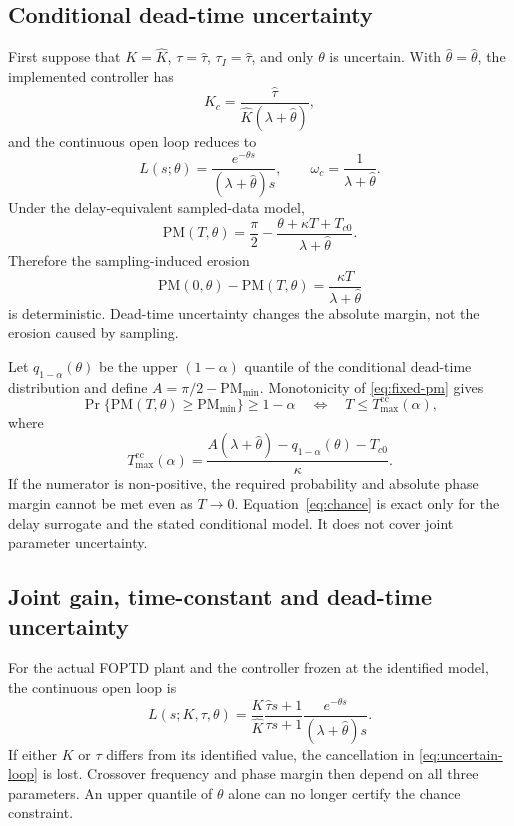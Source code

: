 \documentclass[a4paper,fleqn]{cas-sc}
\theoremstyle{remark}
\newcommand{\Tmaxcc}{T_{\max}^{\mathrm{cc}}}
\newcommand{\thetad}{\widehat{\theta}}
\begin{document}
\subsection{Conditional dead-time uncertainty}
First suppose that $K=\widehat K$, $\tau=\widehat\tau$, $\tau_I=\widehat\tau$, and only $\theta$ is uncertain. With $\thetad=\widehat\theta$, the implemented controller has
\begin{equation}
K_c=\frac{\widehat\tau}{\widehat K(\lambda+\thetad)},
\label{eq:fixed-controller}
\end{equation}
and the continuous open loop reduces to
\begin{equation}
L(s;\theta)=\frac{e^{-\theta s}}{(\lambda+\thetad)s},
\qquad \omega_c=\frac{1}{\lambda+\thetad}.
\label{eq:uncertain-loop}
\end{equation}
Under the delay-equivalent sampled-data model,
\begin{equation}
\mathrm{PM}(T,\theta)=\frac{\pi}{2}
-\frac{\theta+\kappa T+T_{c0}}{\lambda+\thetad}.
\label{eq:fixed-pm}
\end{equation}
Therefore the sampling-induced erosion
\begin{equation}
\mathrm{PM}(0,\theta)-\mathrm{PM}(T,\theta)
=\frac{\kappa T}{\lambda+\thetad}
\label{eq:fixed-erosion}
\end{equation}
is deterministic. Dead-time uncertainty changes the absolute margin, not the erosion caused by sampling.

Let $q_{1-\alpha}(\theta)$ be the upper $(1-\alpha)$ quantile of the conditional dead-time distribution and define $A=\pi/2-\mathrm{PM}_{\min}$. Monotonicity of \cref{eq:fixed-pm} gives
\begin{equation}
\Pr\{\mathrm{PM}(T,\theta)\geq\mathrm{PM}_{\min}\}\geq1-\alpha
\quad\Longleftrightarrow\quad
T\leq\Tmaxcc(\alpha),
\label{eq:chance-event}
\end{equation}
where
\begin{equation}
\Tmaxcc(\alpha)=
\frac{A(\lambda+\thetad)-q_{1-\alpha}(\theta)-T_{c0}}{\kappa}.
\label{eq:chance}
\end{equation}
If the numerator is non-positive, the required probability and absolute phase margin cannot be met even as $T\rightarrow0$. Equation~\eqref{eq:chance} is exact only for the delay surrogate and the stated conditional model. It does not cover joint parameter uncertainty.

\subsection{Joint gain, time-constant and dead-time uncertainty}
For the actual FOPTD plant and the controller frozen at the identified model, the continuous open loop is
\begin{equation}
L(s;K,\tau,\theta)=
\frac{K}{\widehat K}
\frac{\widehat\tau s+1}{\tau s+1}
\frac{e^{-\theta s}}{(\lambda+\widehat\theta)s}.
\label{eq:joint-loop}
\end{equation}
If either $K$ or $\tau$ differs from its identified value, the cancellation in \cref{eq:uncertain-loop} is lost. Crossover frequency and phase margin then depend on all three parameters. An upper quantile of $\theta$ alone can no longer certify the chance constraint.
\end{document}

